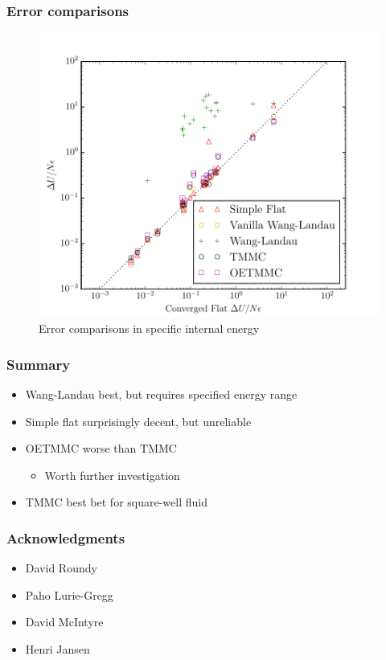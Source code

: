 \documentclass{beamer}
\let\olditem\item
\renewcommand{\item}{\setlength{\itemsep}{6pt}\olditem}
\begin{document}
\begin{frame}
  \frametitle{Error comparisons}
  \begin{figure}
    \centering
    \includegraphics[height=0.75\textheight]{figs/u-comps.pdf}
    \caption{Error comparisons in specific internal energy}
  \end{figure}
\end{frame}

\begin{frame}
  \frametitle{Summary}
  \begin{itemize}
  \item Wang-Landau best, but requires specified energy range
  \item Simple flat surprisingly decent, but unreliable
  \item OETMMC worse than TMMC
    \begin{itemize}
    \item Worth further investigation
    \end{itemize}
  \item TMMC best bet for square-well fluid
  \end{itemize}
\end{frame}

\begin{frame}
  \frametitle{Acknowledgments}
  \begin{itemize}
  \item David Roundy
  \item Paho Lurie-Gregg
  \item David McIntyre
  \item Henri Jansen
  \end{itemize}
\end{frame}
\end{document}
